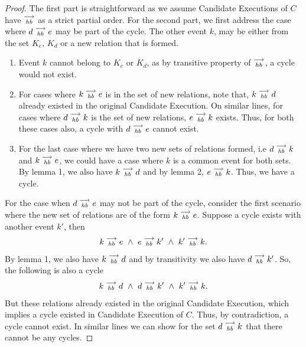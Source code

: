 \begin{proof}
        The first part is straightforward as we assume Candidate Executions of $C$ have $\stackrel{\longrightarrow}{_\textit{hb}}$ as a strict partial order. For the second part, we first address the case where $d\stackrel{\longrightarrow}{_{\textit{hb}}}e$ may be part of the cycle. The other event $k$, may be either from the set $K_e$, $K_d$ or a new relation that is formed.
        
        \begin{enumerate}
            \item Event $k$ cannot belong to $K_e$ or $K_d$, as by transitive property of $\stackrel{\longrightarrow}{_{hb}}$, a cycle would not exist. 
            \item For cases where $k\stackrel{\longrightarrow}{_{\textit{hb}}}e$ is in the set of new relations, note that, $k\stackrel{\longrightarrow}{_{\textit{hb}}}d$ already existed in the original Candidate Execution. On similar lines, for cases where $d\stackrel{\longrightarrow}{_{\textit{hb}}}k$ is the set of new relations, $e\stackrel{\longrightarrow}{_{\textit{hb}}}k$ exists. Thus, for both these cases also, a cycle with $d\stackrel{\longrightarrow}{_{\textit{hb}}}e$  cannot exist. 
            \item For the last case where we have two new sets of relations formed, i.e $d\stackrel{\longrightarrow}{_{\textit{hb}}}k$ and $k\stackrel{\longrightarrow}{_{\textit{hb}}}e$, we could have a case where $k$ is a common event for both sets. By lemma 1, we also have $k\stackrel{\longrightarrow}{_{\textit{hb}}}d$ and by lemma 2, $e\stackrel{\longrightarrow}{_{\textit{hb}}}k$. Thus, we have a cycle. 
        \end{enumerate}
        
        For the case when $d\stackrel{\longrightarrow}{_{\textit{hb}}}e$ may not be part of the cycle, consider the first scenario where the new set of relations are of the form $k\stackrel{\longrightarrow}{_{\textit{hb}}}e$. Suppose a cycle exists with another event $k'$, then
        \begin{align*}
            \reln{k}{hb}{e} \ \wedge \ \reln{e}{hb}{k'} \ \wedge \ \reln{k'}{hb}{k}.
        \end{align*}
        By lemma 1, we also have $k\stackrel{\longrightarrow}{_{\textit{hb}}}d$ and by transitivity we also have $d\stackrel{\longrightarrow}{_{\textit{hb}}}k'$. So, the following is also a cycle
        \begin{align*}
            \reln{k}{hb}{d} \ \wedge \ \reln{d}{hb}{k'} \ \wedge \ \reln{k'}{hb}{k}.
        \end{align*}
        But these relations already existed in the original Candidate Execution, which implies a cycle existed in Candidate Execution of $C$. Thus, by contradiction, a cycle cannot exist. In similar lines we can show for the set $d\stackrel{\longrightarrow}{_{\textit{hb}}}k$ that there cannot be any cycles. 
    


\end{proof}
